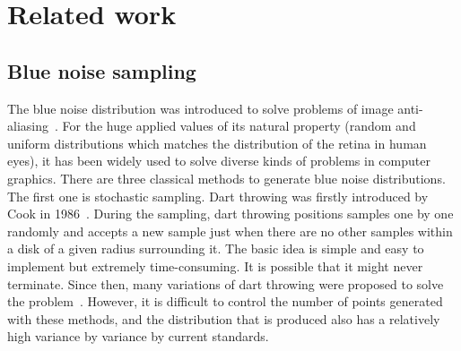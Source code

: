 \section{Related work}

\subsection{Blue noise sampling}
The blue noise distribution was introduced to solve
problems of image anti-aliasing~\cite{dippe:1985:antialiasing}. For
the huge applied values of its natural property (random and uniform
distributions which matches the distribution of the retina  in human eyes),
it has been widely used to solve diverse kinds of problems in computer
graphics.
There are three classical methods to generate blue noise
distributions.
The first one is stochastic sampling.
Dart throwing was firstly introduced by
Cook in 1986~\cite{cook:1986:stochastic}. 
During the sampling, dart throwing positions
samples one by one randomly and accepts a new sample just when there are no
other samples within a disk of a given radius surrounding it. 
The basic idea
is simple and easy to implement but extremely time-consuming. 
It is possible that it might never terminate.
Since then, many variations of dart throwing were proposed to
solve the problem~\cite{Mitchell:1987:generating,dunbar:2006:spatial,white:2007:poisson,wei:2008:parallel,gamito:2009:accurate,ebeida:2011:efficient}.
However, it is difficult to control the number of points generated with these methods,
and the distribution that is produced also
has a relatively high variance by variance by current standards.

